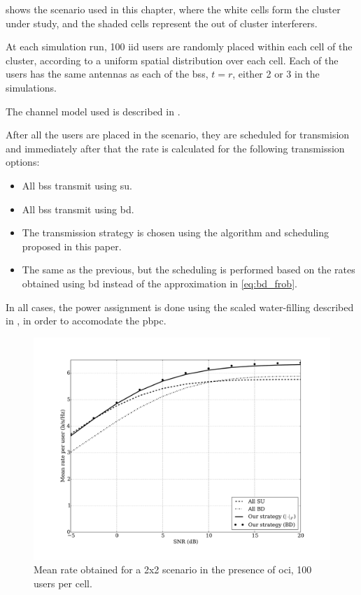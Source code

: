  shows the scenario used in this chapter, where the
white cells form the cluster under study, and the shaded cells represent the out
of cluster interferers.

At each simulation run, 100 \gls{iid} users are randomly placed within each cell
of the cluster, according to a uniform spatial distribution over each cell. Each
of the users has the same antennas as each of the \glspl{bs}, \ie $t=r$, either
2 or 3 in the simulations.

The channel model used is described in .

After all the users are placed in the scenario, they are scheduled for
transmision and immediately after that the rate is calculated for the following
transmission options:

\begin{itemize}
    \item All \glspl{bs} transmit using \gls{su}.
    \item All \glspl{bs} transmit using \gls{bd}.
    \item The transmission strategy is chosen using the algorithm and scheduling
        proposed in this paper.
    \item The same as the previous, but the scheduling is performed based on the
        rates obtained using \gls{bd} instead of the approximation in
        \eqref{eq:bd_frob}.
\end{itemize}

In all cases, the power assignment is done using the scaled water-filling
described in , in order to accomodate the \gls{pbpc}.

\begin{figure}[t]
\centering
\includegraphics[width=0.75\columnwidth]{./12.simple_threshold_scheduling/figure/mean_rate_02x02_100user_bd}
\caption{Mean rate obtained for a 2x2 scenario in the presence of \gls{oci}, 100
users per cell.}
\label{fig:mean_rate_2x2}
\end{figure}

